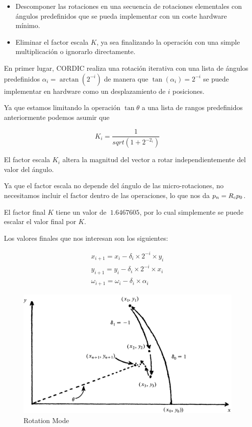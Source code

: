 \begin{itemize}
	\item Descomponer las rotaciones en una secuencia de rotaciones elementales con ángulos predefinidos que se pueda implementar con un coste hardware mínimo.
	\item Eliminar el factor escala $K$, ya sea finalizando la operación con una simple multiplicación o ignorarlo directamente.
\end{itemize}

En primer lugar, CORDIC realiza una rotación iterativa con una lista de ángulos predefinidos $\alpha_{i} = \arctan({2^{-i}})$ de manera que $\tan({\alpha_{i}}) = 2^{-i}$ se puede implementar en hardware como un desplazamiento de $i$ posiciones.

Ya que estamos limitando la operación $\tan{\theta}$ a una lista de rangos predefinidos anteriormente podemos asumir que

\[
	K_{i} = \frac{1}{sqrt{(1+2^{-2_{i}})}}
\]

El factor escala $K_{i}$ altera la magnitud del vector a rotar independientemente del valor del ángulo. 

Ya que el factor escala no depende del ángulo de las micro-rotaciones, no necesitamos incluir el factor dentro de las operaciones, lo que nos da $\boldmath{p_{n} = R_{c}p_{0}}$.

El factor final $K$ tiene un valor de $~1.6467605$, por lo cual simplemente se puede escalar el valor final por $K$.

Los valores finales que nos interesan son los siguientes:

\[
\begin{matrix}
	x_{i+1} = x_{i} - \delta_{i} \times 2^{-i} \times y_{i} \\
	y_{i+1} = y_{i} - \delta_{i} \times 2^{-i} \times x_{i} \\
	\omega_{i+1} =  \omega_{i} - \delta_{i} \times \alpha_{i}
\end{matrix}
\]

\begin{figure}[ht]
	\centering
	\includegraphics[width=\textwidth]{archivos/CORDIC/RotationMode.png}
	\caption{Rotation Mode}
	\label{graf:RM}
\end{figure}

